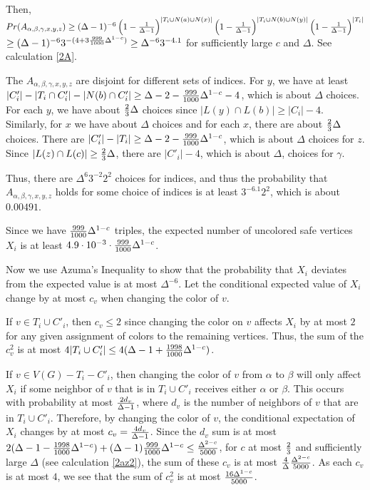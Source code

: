 \documentclass[12pt]{article}
\theoremstyle{definition}
\begin{document}
Then, $Pr(A_{\alpha, \beta, \gamma, x, y, z})\geq (\Delta-1)^{-6}\left(1-{1\over \Delta-1}\right)^{|T_i\cup N(a)\cup N(x)|}\left(1-{1\over \Delta-1}\right)^{|T_i\cup N(b)\cup N(y)|}\left(1-{1\over \Delta-1}\right)^{|T_i|}$
$\geq (\Delta-1)^{-6}3^{-(4+3{999\over 1 000}\Delta^{1-c})}\geq \Delta^{-6} 3^{-4.1}$ for sufficiently large $c$ and $\Delta$. See calculation \ref{2A}.

The $A_{\alpha, \beta, \gamma, x, y, z}$ are disjoint for different sets of indices. 
For $y$, we have at least $|C'_i|-|T_i\cap C'_i|-|N(b)\cap C'_i|\geq \Delta-2-{999\over 1000}\Delta^{1-c}-4$, which is about $\Delta$ choices. 
For each $y$, we have about ${2\over 3}\Delta$ choices since $|L(y)\cap L(b)|\geq |C_i|-4$. 
Similarly, for $x$ we have about $\Delta$ choices and for each $x$, there are about ${2\over 3}\Delta$ choices. 
There are $|C'_i|-|T_i|\geq \Delta-2-{999\over 1000}\Delta^{1-c}$, which is about $\Delta$ choices for $z$. Since $|L(z)\cap L(c)|\geq {2\over 3}\Delta$, there are $|C'_i|-4$, which is about $\Delta$, choices for $\gamma$. 

Thus, there are $\Delta^6 3^{-2}2^2$ choices for indices, and thus the probability that $A_{\alpha, \beta, \gamma, x, y, z}$ holds for some choice of indices is at least $3^{-6.1}2^2$, which is about $0.00491$. 

Since we have ${999\over 1000}\Delta^{1-c}$ triples, the expected number of uncolored safe vertices $X_i$ is at least $4.9\cdot 10^{-3}\cdot {999\over 1000}\Delta^{1-c}$. 

Now we use Azuma's Inequality to show that the probability that $X_i$ deviates from the expected value is at most $\Delta^{-6}$. 
Let the conditional expected value of $X_i$ change by at most $c_v$ when changing the color of $v$. 

If $v\in T_i\cup C'_i$, then $c_v\leq 2$ since changing the color on $v$ affects $X_i$ by at most $2$ for any given assignment of colors to the remaining vertices.
Thus, the sum of the $c_v^2$ is at most $4|{T}_i\cup C'_i|\leq 4(\Delta-1+{1998\over 1000}\Delta^{1-c})$.

If $v\in V(G)-T_i-C'_i$, then changing the color of $v$ from $\alpha$ to $\beta$ will only affect $X_i$ if some neighbor of $v$ that is in $T_i\cup C'_i$ receives either $\alpha$ or $\beta$. 
This occurs with probability at most ${2d_v\over \Delta-1}$, where $d_v$ is the number of neighbors of $v$ that are in $T_i\cup C'_i$. 
Therefore, by changing the color of $v$, the conditional expectation of $X_i$ changes by at most $c_v={4d_v\over \Delta-1}$. 
Since the $d_v$ sum is at most $2(\Delta-1-{1998\over 1000}\Delta^{1-c}) + (\Delta-1){999\over 1000}\Delta^{1-c} \leq {\Delta^{2-c}\over 5000}$, for $c$ at most $2\over 3$ and sufficiently large $\Delta$ (see calculation \ref{2az2}), the sum of these $c_v$ is at most ${{4\over \Delta}{\Delta^{2-c}\over 5000}}$. 
As each $c_v$ is at most $4$, we see that the sum of $c_v^2$ is at most ${16\Delta^{1-c}\over 5000}$.
\end{document}
